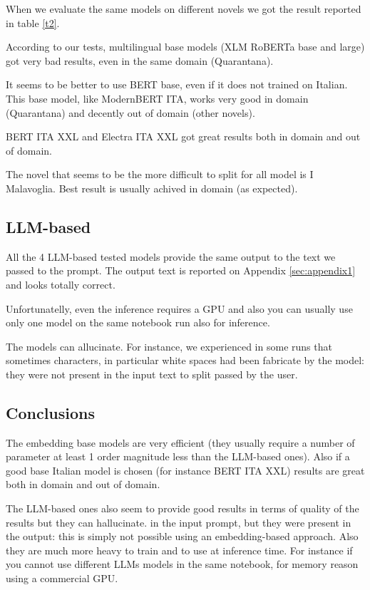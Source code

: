\documentclass[11pt]{article}
\begin{document}
When we evaluate the same models on different novels we got the
result reported in table \ref{t2}.

According to our tests, multilingual base models (XLM RoBERTa base and large)
got very bad results, even in the same domain (Quarantana).

It seems to be better to use BERT base, even if it does not trained on Italian.
This base model, like ModernBERT ITA, works very good in domain (Quarantana) and
decently out of domain (other novels).

BERT ITA XXL and Electra ITA XXL got great results both in domain and out of domain.

The novel that seems to be the more difficult to split for all model is I Malavoglia.
Best result is usually achived in domain (as expected).

\subsection{LLM-based}

All the 4 LLM-based tested models provide the same output to the text 
we passed to the prompt. The output text is reported on Appendix \ref{sec:appendix1}
and looks totally correct. 

Unfortunatelly, even the inference requires a GPU and also 
you can usually use only one model on the same notebook run 
also for inference.

The models can allucinate. For instance, we experienced in some runs that 
sometimes characters, in particular white spaces had been fabricate by the model: they were not present in the input text to split passed by the user.

\subsection{Conclusions}

The embedding base models are very efficient (they usually require a
number of parameter at least 1 order magnitude less than the LLM-based ones).
Also if a good base Italian model is chosen (for instance BERT ITA XXL)
results are great both in domain and out of domain.

The LLM-based ones also seem to provide good results in terms of quality
of the results but they can hallucinate. 
in the input prompt, but they were present in the output: this is simply not possible
using an embedding-based approach.
Also they are much more heavy to train and to use at inference time.
For instance if you cannot use different LLMs models in the same notebook,
for memory reason using a commercial GPU. 
\end{document}
